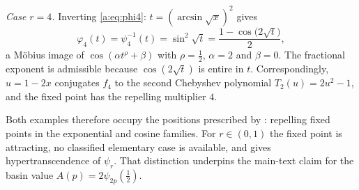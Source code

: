 \emph{Case $r=4$.} Inverting \eqref{a:eq:phi4}: $t=(\arcsin\sqrt{x})^2$ gives
\[
\varphi_4(t)=\psi_4^{-1}(t)=\sin^2\!\sqrt{t}=\frac{1-\cos\bigl(2\sqrt{t}\bigr)}{2},
\]
a M\"obius image of $\cos(\alpha t^{\rho}+\beta)$ with $\rho=\tfrac12$,
$\alpha=2$ and $\beta=0$.  The fractional exponent is admissible because
$\cos(2\sqrt{t})$ is entire in $t$.  Correspondingly, $u=1-2x$ conjugates
$f_4$ to the second Chebyshev polynomial $T_2(u)=2u^2-1$, and the fixed point has
the repelling multiplier $4$.

Both examples therefore occupy the positions prescribed by
: repelling fixed points in the exponential and cosine
families.  For $r\in(0,1)$ the fixed point is attracting, no classified elementary
case is available, and  gives hypertranscendence of $\psi_r$.
That distinction underpins the main-text claim for the basin value
$A(p)=2\psi_{2p}(\tfrac12)$.
